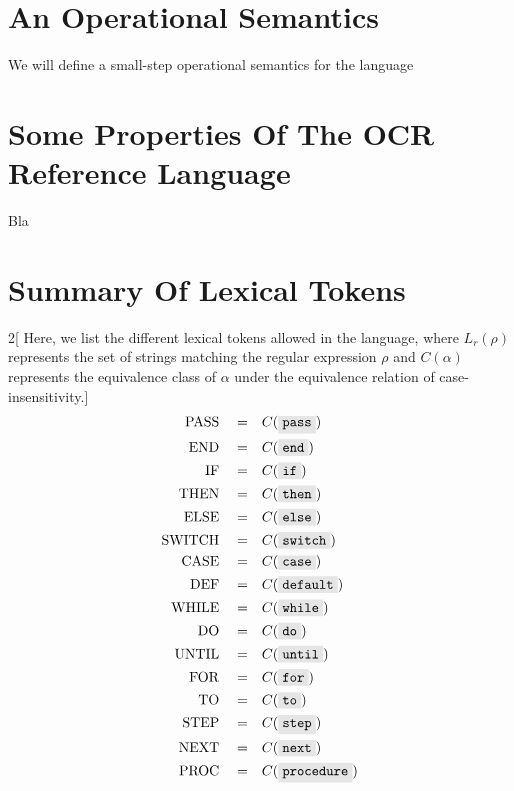 \documentclass{article}
\newcommand{\code}[1]{\colorbox{gray!20}{\texttt{#1}}}
\begin{document}
\section{An Operational Semantics}
    We will define a small-step operational semantics for the language

\section{Some Properties Of The OCR Reference Language}
    Bla

\printbibliography
\newpage
\appendix
\section{Summary Of Lexical Tokens}
\begin{multicols}{2}[
Here, we list the different lexical tokens allowed in the language, where $L_r(\rho)$ represents the set of strings matching the regular expression $\rho$ and $C(\alpha)$ represents the equivalence class of $\alpha$ under the equivalence relation of case-insensitivity.]
\begin{align}
    \mathrm{PASS}\quad =&\quad C( \code{pass} ) \\
    \mathrm{END}\quad =& \quad C(\code{end}) \\
    \mathrm{IF}\quad =&\quad C( \code{if} ) \\
    \mathrm{THEN}\quad =&\quad C( \code{then} ) \\
    \mathrm{ELSE}\quad =&\quad C( \code{else} ) \\
    \mathrm{SWITCH}\quad =&\quad C( \code{switch} ) \\
    \mathrm{CASE}\quad =&\quad C( \code{case} ) \\
    \mathrm{DEF}\quad =&\quad C( \code{default} ) \\
    \mathrm{WHILE}\quad =&\quad C( \code{while} ) \\
    \mathrm{DO}\quad =&\quad C( \code{do} ) \\
    \mathrm{UNTIL}\quad =&\quad C( \code{until} ) \\
    \mathrm{FOR}\quad =&\quad C( \code{for} ) \\
    \mathrm{TO}\quad =&\quad C( \code{to} ) \\
    \mathrm{STEP}\quad =&\quad C( \code{step} ) \\
    \mathrm{NEXT}\quad =&\quad C( \code{next} ) \\
    \mathrm{PROC}\quad =&\quad C( \code{procedure} ) \\

\end{align}
\end{multicols}
\end{document}
